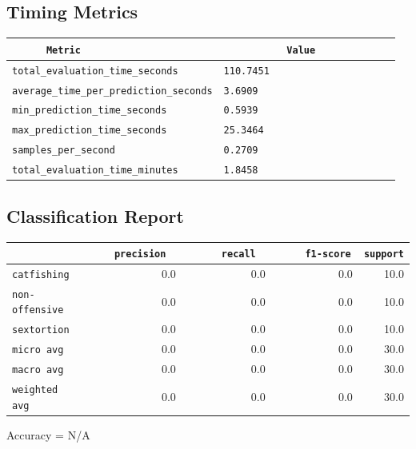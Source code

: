 \documentclass{article}
\begin{document}
\subsection{Timing Metrics}

\begin{center}
\begin{tabular}{l | l} \hline
    \verb|      Metric     | & \verb|           Value           | \\ \hline
    \hline
    \verb|total_evaluation_time_seconds| & \verb|110.7451                     | \\ \hline
    \verb|average_time_per_prediction_seconds| & \verb|3.6909                       | \\ \hline
    \verb|min_prediction_time_seconds| & \verb|0.5939                       | \\ \hline
    \verb|max_prediction_time_seconds| & \verb|25.3464                      | \\ \hline
    \verb|samples_per_second| & \verb|0.2709                       | \\ \hline
    \verb|total_evaluation_time_minutes| & \verb|1.8458                       | \\ \hline
\end{tabular}
\end{center}

\subsection{Classification Report}

\begin{center}
\begin{tabular}{l | r | r | r | r} \hline
    \verb|            | & \verb|    precision     | & \verb|      recall      | & \verb|     f1-score     | & \verb|support| \\ \hline
    \hline
    \verb|catfishing | & 0.0 & 0.0 & 0.0 &    10.0 \\ \hline
    \verb|non-offensive| & 0.0 & 0.0 & 0.0 &    10.0 \\ \hline
    \verb|sextortion | & 0.0 & 0.0 & 0.0 &    10.0 \\ \hline
    \verb|micro avg  | & 0.0 & 0.0 & 0.0 &    30.0 \\ \hline
    \verb|macro avg  | & 0.0 & 0.0 & 0.0 &    30.0 \\ \hline
    \verb|weighted avg| & 0.0 & 0.0 & 0.0 &    30.0 \\ \hline
\end{tabular}
\end{center}

\begin{center}
Accuracy = N/A
\end{center}
\end{document}
